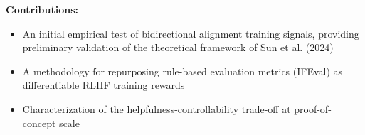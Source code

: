 \textbf{Contributions:}
\begin{itemize}
\item An initial empirical test of bidirectional alignment training signals, providing preliminary validation of the theoretical framework of Sun et al. (2024)
\item A methodology for repurposing rule-based evaluation metrics (IFEval) as differentiable RLHF training rewards
\item Characterization of the helpfulness-controllability trade-off at proof-of-concept scale
\end{itemize}
